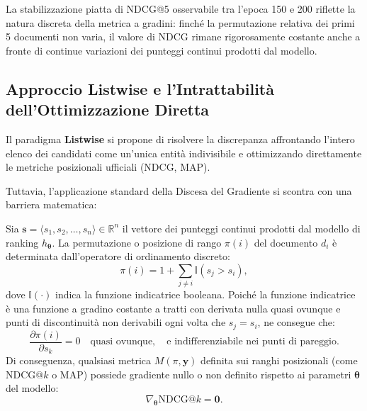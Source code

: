 La stabilizzazione piatta di NDCG@5 osservabile tra l'epoca 150 e 200 riflette la natura discreta della metrica a gradini: finch\'e la permutazione relativa dei primi 5 documenti non varia, il valore di NDCG rimane rigorosamente costante anche a fronte di continue variazioni dei punteggi continui prodotti dal modello.

\FloatBarrier
\subsection{Approccio Listwise e l'Intrattabilit\`a dell'Ottimizzazione Diretta}
\label{subsec:approccio-listwise-intrattabilita}

Il paradigma \textbf{Listwise} si propone di risolvere la discrepanza affrontando l'intero elenco dei candidati come un'unica entit\`a indivisibile e ottimizzando direttamente le metriche posizionali ufficiali (NDCG, MAP).

Tuttavia, l'applicazione standard della Discesa del Gradiente si scontra con una barriera matematica:

\begin{theorem}
Sia $\mathbf{s} = \langle s_1, s_2, \dots, s_n \rangle \in \mathbb{R}^n$ il vettore dei punteggi continui prodotti dal modello di ranking $h_{\mathbf{\theta}}$. La permutazione o posizione di rango $\pi(i)$ del documento $d_i$ \`e determinata dall'operatore di ordinamento discreto:
\begin{equation}
    \pi(i) = 1 + \sum_{j \neq i} \mathbb{I}(s_j > s_i),
    \label{eq:rank-indicator-sum}
\end{equation}
dove $\mathbb{I}(\cdot)$ indica la funzione indicatrice booleana.  
Poich\'e la funzione indicatrice \`e una funzione a gradino costante a tratti con derivata nulla quasi ovunque e punti di discontinuit\`a non derivabili ogni volta che $s_j = s_i$, ne consegue che:
\begin{equation}
    \frac{\partial \pi(i)}{\partial s_k} = 0 \quad \text{quasi ovunque}, \quad \text{e indifferenziabile nei punti di pareggio.}
\end{equation}
Di conseguenza, qualsiasi metrica $M(\pi, \mathbf{y})$ definita sui ranghi posizionali (come NDCG@$k$ o MAP) possiede gradiente nullo o non definito rispetto ai parametri $\mathbf{\theta}$ del modello:
\begin{equation}
    \nabla_{\mathbf{\theta}} \text{NDCG}@k = \mathbf{0}.
\end{equation}
\end{theorem}

